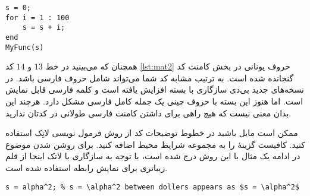 

\begin{latin}
\begin{lstlisting}[caption={\small\rl{
نمونه‌ای از کد که داخل فایل تِک درج شده است.}}, 
label={lst:mat1}]
s = 0;
for i = 1 : 100
    s = s + i;
end
MyFunc(s)
\end{lstlisting}


\end{latin}

همچنان که می‌بینید در خط $13$ و $14$ کد 
\ref{lst:mat2} 
حروف یونانی در بخش کامنت کد گنجانده شده است. به ترتیب مشابه کد شما می‌تواند شامل حروف فارسی باشد. در نسخه‌های جدید بی‌دی سازگاری با بسته 
افزایش یافته است و کلمه فارسی قابل نمایش است. اما هنوز این بسته با حروف چینی یک جمله کامل فارسی مشکل دارد. هرچند این بدان معنی نیست که هیچ راهی برای داشتن کامنت فارسی طولانی در کدتان ندارید.

ممکن است مایل باشید در خطوط توضیحات%
کد از روش فرمول نویسی لاتِک استفاده کنید. کافیست گزینهٔ 
را به مجموعه شرایط محیط 
اضافه کنید. برای روشن شدن موضوع در ادامه یک مثال با این روش درج شده است، با توجه به سازگاری با لاتک اینجا از قلم زیباتری برای نمایش رابطه استفاده شده است.

\begin{latin}
\begin{lstlisting}[mathescape=true,title={\small\rl{
نمونه‌ای از کد که شامل رابطهٔ ریاضی با الگوی تِک است.}}]
s = alpha^2; % s = \alpha^2 between dollers appears as $s = \alpha^2$
\end{lstlisting}
\end{latin}
